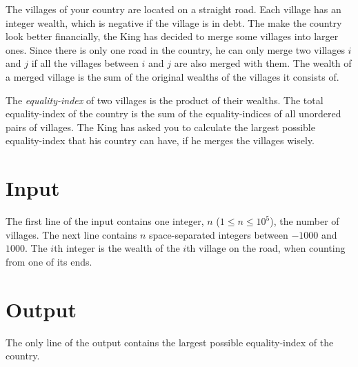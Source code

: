 
The villages of your country are located on a straight road.
Each village has an integer wealth, which is negative if the village is in debt.
The make the country look better financially, the King has decided to merge some villages into larger ones.
Since there is only one road in the country, he can only merge two villages $i$ and $j$ if all the villages between $i$ and $j$ are also merged with them.
The wealth of a merged village is the sum of the original wealths of the villages it consists of.

The \textit{equality-index} of two villages is the product of their wealths.
The total equality-index of the country is the sum of the equality-indices of all unordered pairs of villages.
The King has asked you to calculate the largest possible equality-index that his country can have, if he merges the villages wisely.

\section*{Input}
The first line of the input contains one integer, $n$ ($1 \leq n \leq 10^5$),  the number of villages.
The next line contains $n$ space-separated integers between $-1000$ and $1000$.
The $i$th integer is the wealth of the $i$th village on the road, when counting from one of its ends.

\section*{Output}
The only line of the output contains the largest possible equality-index of the country.
